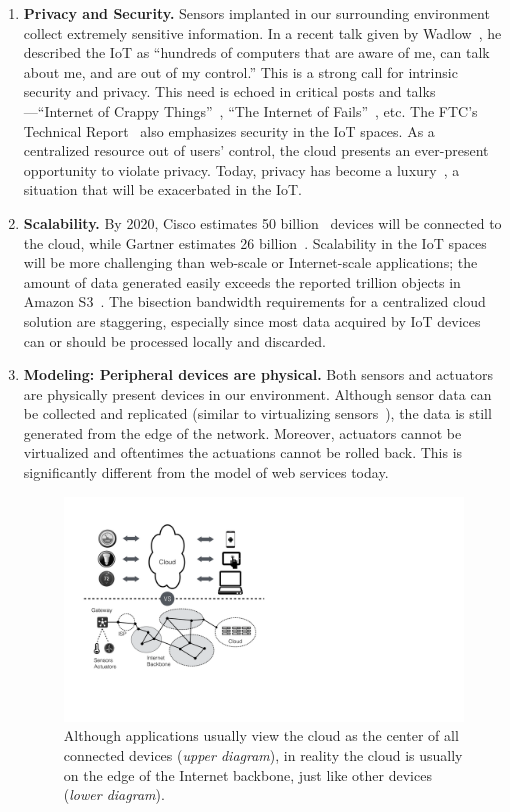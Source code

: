 \begin{enumerate}

\item \textbf{Privacy and Security.} Sensors implanted in our surrounding
  environment collect extremely sensitive information.  In a recent talk given
  by Wadlow~\cite{wadlow}, he described the IoT as ``hundreds of computers that
  are aware of me, can talk about me, and are out of my control.''  This is a
  strong call for intrinsic security and privacy.  This need is echoed in
  critical posts and talks---``Internet of Crappy
  Things''~\cite{alex2015internet}, ``The Internet of
  Fails''~\cite{stanislav2014the}, etc.  The FTC's Technical
  Report~\cite{ftc2015internet} also emphasizes security in the IoT spaces.  As
  a centralized resource out of users' control, the cloud presents an
  ever-present opportunity to violate privacy.  Today, privacy has become a
  luxury~\cite{angwin2014has}, a situation that will be exacerbated in the IoT.

\item \textbf{Scalability.} By 2020, Cisco estimates 50
  billion~\cite{evans2011internet} devices will be connected to the cloud, while
  Gartner estimates 26 billion~\cite{middleton2013forecast}. Scalability in the
  IoT spaces will be more challenging than web-scale or Internet-scale
  applications; the amount of data generated easily exceeds the reported
  trillion objects in Amazon S3~\cite{barr2013amazon}. The bisection bandwidth
  requirements for a centralized cloud solution are staggering, especially since
  most data acquired by IoT devices can or should be processed locally and
  discarded.

\item \textbf{Modeling: Peripheral devices are physical.}  Both sensors and
  actuators are physically present devices in our environment.  Although sensor
  data can be collected and replicated (similar to virtualizing
  sensors~\cite{yuriyama2010sensor}), the data is still generated from the edge
  of the network.  Moreover, actuators cannot be virtualized and oftentimes the
  actuations cannot be rolled back.  This is significantly different from the
  model of web services today.

\begin{figure}
  \centering
  \includegraphics[width=0.6\columnwidth]{figures/cloud-view.pdf}
  \caption{Although applications usually view the cloud as the center of
    all connected devices (\textit{upper diagram}), in reality the cloud
    is usually on the edge of the Internet backbone, just like other
    devices (\textit{lower diagram}).}
  \label{fig:network}
\end{figure}


\end{enumerate}
